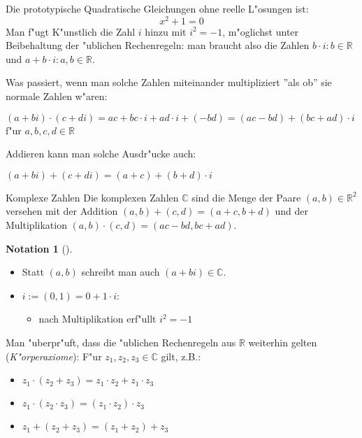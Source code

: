 \documentclass[oneside,fontsize=11pt,paper=a4,BCOR=0mm,DIV=12,automark,headsepline]{scrbook}
\theoremstyle{remark}
\theoremstyle{definition}
\newtheorem*{notation}{Notation}
\theoremstyle{definition}
\theoremstyle{remark}
\begin{document}
\begin{relation}
  Die prototypische Quadratische Gleichungen ohne reelle L"osungen ist: \[x^2+1 =
    0\]
  Man f"ugt K"unstlich die Zahl \(i\) hinzu mit \(i^2=-1\), m"oglichst unter
  Beibehaltung der "ublichen Rechenregeln: man braucht also die Zahlen \(b\cdot i :
  b\in \mathbb{R}\) und \(a+b\cdot i :  a,b\in \mathbb{R}\).
\end{relation}

Was passiert, wenn man solche Zahlen miteinander multipliziert ''als ob'' sie
normale Zahlen w"aren: 
\begin{relation}
  \((a+bi)\cdot(c+di)=ac+bc\cdot i+ad\cdot i+(-bd)=(ac-bd)+(bc+ad)\cdot i\) f"ur \(a,b,c,d\in \mathbb{R}\)
\end{relation}

Addieren kann man solche Ausdr"ucke auch:
\begin{relation}
  \((a+bi)+(c+di)=(a+c)+(b+d)\cdot i\)
\end{relation}

\begin{definition}{Komplexe Zahlen}{}
  Die komplexen Zahlen \(\mathbb{C}\) sind die Menge der Paare \((a,b)\in
  \mathbb{R}^2\) versehen mit der Addition \((a,b)+(c,d)=(a+c,b+d)\) und der
  Multiplikation \((a,b)\cdot (c,d)=(ac-bd, bc+ad)\).
\end{definition}

\begin{notation}[] \
  \begin{itemize}
  \item Statt \((a,b)\) schreibt man auch \((a+bi)\in \mathbb{C}\).
  \item \(i:=(0,1)=0+1\cdot i\):
    \begin{itemize}
    \item nach Multiplikation erf"ullt \(i^2=-1\)
    \end{itemize}
  \end{itemize}
\end{notation}

Man "uberpr"uft, dass die "ublichen Rechenregeln aus \(\mathbb{R}\) weiterhin
gelten (\emph{K"orperaxiome}): F"ur \(z_1, z_2, z_3 \in \mathbb{C}\) gilt, z.B.:
\begin{relation}
  \begin{itemize}
  \item \(z_1\cdot (z_2+z_3)=z_1\cdot z_2+z_1\cdot z_3\)
  \item \(z_1\cdot (z_2\cdot z_3)=(z_1\cdot z_2)\cdot z_3\)
  \item \(z_1 + (z_2 + z_3)=(z_1 + z_2) + z_3\)
  \end{itemize}
\end{relation}
\end{document}
